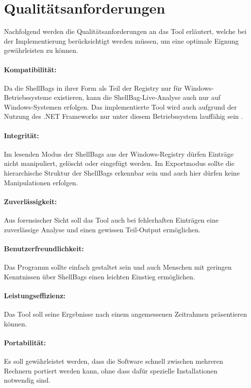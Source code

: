 \section{Qualitätsanforderungen} \label{quali}
\vspace{0.5cm}
Nachfolgend werden die Qualitätsanforderungen an das Tool erläutert, welche bei der Implementierung berücksichtigt werden müssen, um eine optimale Eignung gewährleisten zu können.
\paragraph{Kompatibilität:}
Da die ShellBags in ihrer Form als Teil der Registry nur für Windows-Betriebssysteme existieren, kann die ShellBag-Live-Analyse auch nur auf Windows-Systemen erfolgen. Das implementierte Tool wird auch aufgrund der Nutzung des .NET Frameworks nur unter diesem Betriebssystem lauffähig sein \cite{netfw}.
\paragraph{Integrität:}
Im lesenden Modus der ShellBags aus der Windows-Registry dürfen Einträge nicht manipuliert, gelöscht oder eingefügt werden. Im Exportmodus sollte die hierarchische Struktur der ShellBags erkennbar sein und auch hier dürfen keine Manipulationen erfolgen.
\paragraph{Zuverlässigkeit:}
Aus forensischer Sicht soll das Tool auch bei fehlerhaften Einträgen eine zuverlässige Analyse und einen gewissen Teil-Output ermöglichen.
\paragraph{Benutzerfreundlichkeit:}
Das Programm sollte einfach gestaltet sein und auch Menschen mit geringen Kenntnissen über ShellBags einen leichten Einstieg ermöglichen.
\paragraph{Leistungseffizienz:}
Das Tool soll seine Ergebnisse nach einem angemessenen Zeitrahmen präsentieren können.
\paragraph{Portabilität:}
Es soll gewährleistet werden, dass die Software schnell zwischen mehreren Rechnern portiert werden kann, ohne dass dafür spezielle Installationen notwendig sind.






